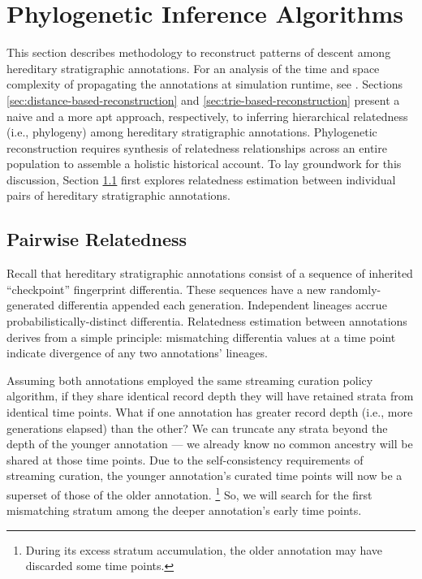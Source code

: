 \section{Phylogenetic Inference Algorithms} \label{sec:reconstruction-algorithm}

This section describes methodology to reconstruct patterns of descent among hereditary stratigraphic annotations.  %
For an analysis of the time and space complexity of propagating the annotations at simulation runtime, see \citet{moreno2024algorithms}.
Sections \ref{sec:distance-based-reconstruction} and \ref{sec:trie-based-reconstruction} present a naive and a more apt approach, respectively, to inferring hierarchical relatedness (i.e., phylogeny) among hereditary stratigraphic annotations.
Phylogenetic reconstruction requires synthesis of relatedness relationships across an entire population to assemble a holistic historical account.  %
To lay groundwork for this discussion, Section \ref{sec:pairwise-relatedness} first explores relatedness estimation between individual pairs of hereditary stratigraphic annotations.

\subsection{Pairwise Relatedness}
\label{sec:pairwise-relatedness}
Recall that hereditary stratigraphic annotations consist of a sequence of inherited ``checkpoint'' fingerprint differentia.
These sequences have a new randomly-generated differentia appended each generation.
Independent lineages accrue probabilistically-distinct differentia.
Relatedness estimation between annotations derives from a simple principle: mismatching differentia values at a time point indicate divergence of any two annotations' lineages.

Assuming both annotations employed the same streaming curation policy algorithm, if they share identical record depth they will have retained strata from identical time points.
What if one annotation has greater record depth (i.e., more generations elapsed) than the other?
We can truncate any strata beyond the depth of the younger annotation --- we already know no common ancestry will be shared at those time points.
Due to the self-consistency requirements of streaming curation, the younger annotation's curated time points will now be a superset of those of the older annotation.%
\footnote{During its excess stratum accumulation, the older annotation may have discarded some time points.}
So, we will search for the first mismatching stratum among the deeper annotation's early time points.

